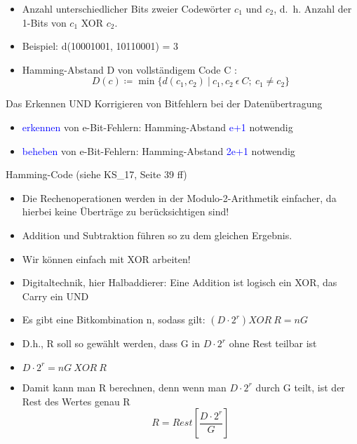 \begin{itemize}
    \item Anzahl unterschiedlicher Bits zweier Codewörter $c_1$ und $c_2$, d.\ h. Anzahl der 1-Bits von $c_1$ XOR $c_2$.
    \item Beispiel: d(10001001, 10110001) = 3
    \item Hamming-Abstand D von vollständigem Code C : \[ D(c)\coloneqq \min\{d(c_1 ,c_2)\ |\ c_1 ,c_2\ \epsilon \ C; \ c_1 \neq c_2\}\]
\end{itemize}

Das Erkennen UND Korrigieren von Bitfehlern bei der Datenübertragung

\begin{itemize}
    \item \textcolor{blue}{erkennen} von e-Bit-Fehlern: Hamming-Abstand \textcolor{blue}{e+1} notwendig
    \item \textcolor{blue}{beheben} von e-Bit-Fehlern: Hamming-Abstand \textcolor{blue}{2e+1} notwendig
\end{itemize}

Hamming-Code (siehe KS\_17, Seite 39 ff)

\begin{itemize}
    \item Die Rechenoperationen werden in der Modulo-2-Arithmetik einfacher, da hierbei keine Überträge zu berücksichtigen sind!
    \item Addition und Subtraktion führen so zu dem gleichen Ergebnis.
    \item Wir können einfach mit XOR arbeiten!
    \item Digitaltechnik, hier Halbaddierer: Eine Addition ist logisch ein XOR, das Carry ein UND
    \item Es gibt eine Bitkombination n, sodass gilt: $(D \cdot 2^r) XOR \ R = n G$
    \item D.h., R soll so gewählt werden, dass G in $D \cdot 2^r$ ohne Rest teilbar ist
    \item $D \cdot 2^r = nG \ XOR \ R$
    \item Damit kann man R berechnen, denn wenn man $D \cdot 2^r$ durch G teilt, ist der Rest des Wertes genau R
    \[R = Rest\left[\frac{D \cdot 2^r}{G}\right]\]
\end{itemize}

